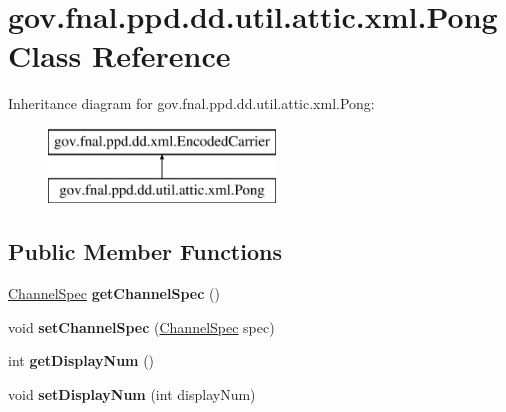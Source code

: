 \hypertarget{classgov_1_1fnal_1_1ppd_1_1dd_1_1util_1_1attic_1_1xml_1_1Pong}{\section{gov.\-fnal.\-ppd.\-dd.\-util.\-attic.\-xml.\-Pong Class Reference}
\label{classgov_1_1fnal_1_1ppd_1_1dd_1_1util_1_1attic_1_1xml_1_1Pong}
}
Inheritance diagram for gov.\-fnal.\-ppd.\-dd.\-util.\-attic.\-xml.\-Pong\-:\begin{figure}[H]
\begin{center}
\leavevmode
\includegraphics[height=2.000000cm]{classgov_1_1fnal_1_1ppd_1_1dd_1_1util_1_1attic_1_1xml_1_1Pong}
\end{center}
\end{figure}
\subsection*{Public Member Functions}
\begin{DoxyCompactItemize}
\item 
\hypertarget{classgov_1_1fnal_1_1ppd_1_1dd_1_1util_1_1attic_1_1xml_1_1Pong_a11620191db3f80622967f6a95dc7b5b6}{\hyperlink{classgov_1_1fnal_1_1ppd_1_1dd_1_1xml_1_1ChannelSpec}{Channel\-Spec} {\bfseries get\-Channel\-Spec} ()}\label{classgov_1_1fnal_1_1ppd_1_1dd_1_1util_1_1attic_1_1xml_1_1Pong_a11620191db3f80622967f6a95dc7b5b6}

\item 
\hypertarget{classgov_1_1fnal_1_1ppd_1_1dd_1_1util_1_1attic_1_1xml_1_1Pong_a923a19cdd09ab6f8a050196b6665ef4d}{void {\bfseries set\-Channel\-Spec} (\hyperlink{classgov_1_1fnal_1_1ppd_1_1dd_1_1xml_1_1ChannelSpec}{Channel\-Spec} spec)}\label{classgov_1_1fnal_1_1ppd_1_1dd_1_1util_1_1attic_1_1xml_1_1Pong_a923a19cdd09ab6f8a050196b6665ef4d}

\item 
\hypertarget{classgov_1_1fnal_1_1ppd_1_1dd_1_1util_1_1attic_1_1xml_1_1Pong_a68c438508ac2a7875f2d652ca1587968}{int {\bfseries get\-Display\-Num} ()}\label{classgov_1_1fnal_1_1ppd_1_1dd_1_1util_1_1attic_1_1xml_1_1Pong_a68c438508ac2a7875f2d652ca1587968}

\item 
\hypertarget{classgov_1_1fnal_1_1ppd_1_1dd_1_1util_1_1attic_1_1xml_1_1Pong_ace7e12649b343ecf857a296f0fabd32a}{void {\bfseries set\-Display\-Num} (int display\-Num)}\label{classgov_1_1fnal_1_1ppd_1_1dd_1_1util_1_1attic_1_1xml_1_1Pong_ace7e12649b343ecf857a296f0fabd32a}

\end{DoxyCompactItemize}

